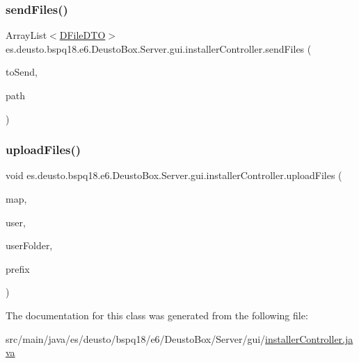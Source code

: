 \mbox{\label{classes_1_1deusto_1_1bspq18_1_1e6_1_1_deusto_box_1_1_server_1_1gui_1_1installer_controller_aedb9be61d6d1c55bb60a3bbd40d5b156}} 
\subsubsection{\texorpdfstring{send\+Files()}{sendFiles()}}
{\footnotesize\ttfamily Array\+List$<$\mbox{\hyperlink{classes_1_1deusto_1_1bspq18_1_1e6_1_1_deusto_box_1_1_server_1_1dto_1_1_d_file_d_t_o}{D\+File\+D\+TO}}$>$ es.\+deusto.\+bspq18.\+e6.\+Deusto\+Box.\+Server.\+gui.\+installer\+Controller.\+send\+Files (\begin{DoxyParamCaption}\item[{Array\+List$<$ \mbox{\hyperlink{classes_1_1deusto_1_1bspq18_1_1e6_1_1_deusto_box_1_1_server_1_1jdo_1_1data_1_1_d_file}{D\+File}} $>$}]{to\+Send,  }\item[{String}]{path }\end{DoxyParamCaption})}

\mbox{\label{classes_1_1deusto_1_1bspq18_1_1e6_1_1_deusto_box_1_1_server_1_1gui_1_1installer_controller_a6cb55b3da1b623735e609f2597139659}} 
\subsubsection{\texorpdfstring{upload\+Files()}{uploadFiles()}}
{\footnotesize\ttfamily void es.\+deusto.\+bspq18.\+e6.\+Deusto\+Box.\+Server.\+gui.\+installer\+Controller.\+upload\+Files (\begin{DoxyParamCaption}\item[{Hash\+Map$<$ String, String $>$}]{map,  }\item[{\mbox{\hyperlink{classes_1_1deusto_1_1bspq18_1_1e6_1_1_deusto_box_1_1_server_1_1jdo_1_1data_1_1_d_user}{D\+User}}}]{user,  }\item[{File}]{user\+Folder,  }\item[{String}]{prefix }\end{DoxyParamCaption})}



The documentation for this class was generated from the following file\+:\begin{DoxyCompactItemize}
\item 
src/main/java/es/deusto/bspq18/e6/\+Deusto\+Box/\+Server/gui/\mbox{\hyperlink{installer_controller_8java}{installer\+Controller.\+java}}\end{DoxyCompactItemize}

